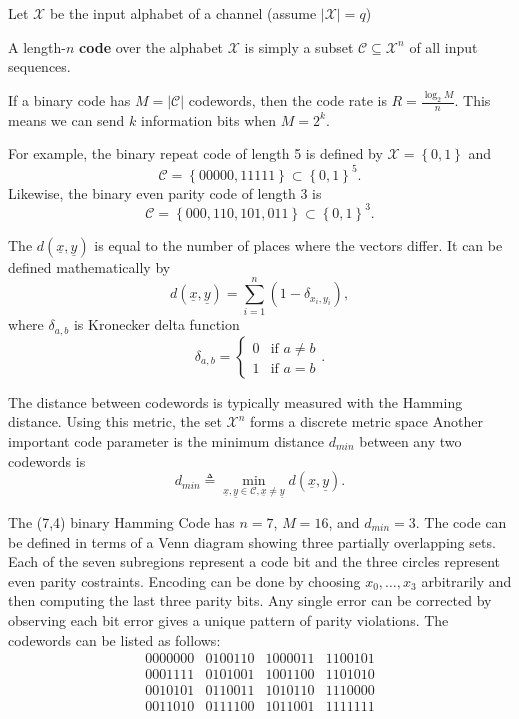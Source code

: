 Let $\mathcal{X}$ be the input alphabet of a channel (assume $\left|\mathcal{X}\right|=q$)
\begin{definition}
A length-$n$ \textbf{code} over the alphabet $\mathcal{X}$ is simply a subset $\mathcal{C}\subseteq\mathcal{X}^{n}$ of all input sequences.
\end{definition}
If a binary code has $M=\left|\mathcal{C}\right|$ codewords, then the code rate is $R=\frac{\log_{2}M}{n}$.
This means we can send $k$ information bits when $M=2^k$.

For example, the binary repeat code of length 5 is defined by $\mathcal{X}=\left\{ 0,1\right\}$ and
\[\mathcal{C}=\left\{ 00000,11111\right\} \subset\left\{ 0,1\right\} ^{5}. \]
Likewise, the binary even parity code of length 3 is
\[ \mathcal{C}=\left\{ 000,110,101,011\right\} \subset\left\{ 0,1\right\} ^{3} . \]

\begin{definition}
The  $d(\underline{x},\underline{y})$ is equal to the number of places where the vectors differ.
It can be defined mathematically by
\[ d(\underline{x},\underline{y}) = \sum_{i=1}^{n}( 1- \delta_{x_{i},y_{i}}), \]
where $\delta_{a,b}$ is Kronecker delta function
\[\delta_{a,b}=\begin{cases}
0 & \mbox{if }a\neq b\\
1 & \mbox{if }a=b\end{cases}. \]
\end{definition}

The distance between codewords is typically measured with the Hamming distance.
Using this metric, the set $\mathcal{X}^{n}$ forms a discrete metric space
Another important code parameter is the minimum distance $d_{min}$ between any two
codewords is
\[ d_{min}\triangleq\min_{\underline{x},\underline{y}\in\mathcal{C},\underline{x}\neq\underline{y}}d(\underline{x},\underline{y}).\]

\begin{example}
The (7,4) binary Hamming Code has $n=7$, $M=16$, and $d_{min}=3$.
The code can be defined in terms of a Venn diagram showing three partially overlapping sets.
Each of the seven subregions represent a code bit and the three circles represent even parity costraints.
Encoding can be done by choosing $x_0,\ldots,x_3$ arbitrarily and then computing the last three parity bits.
Any single error can be corrected by observing each bit error gives a unique pattern of parity violations.
The codewords can be listed as follows:
\[\begin{array}{cccc}
0000000 & 0100110 & 1000011 & 1100101\\
0001111 & 0101001 & 1001100 & 1101010\\
0010101 & 0110011 & 1010110 & 1110000\\
0011010 & 0111100 & 1011001 & 1111111
\end{array} \]
\end{example}

